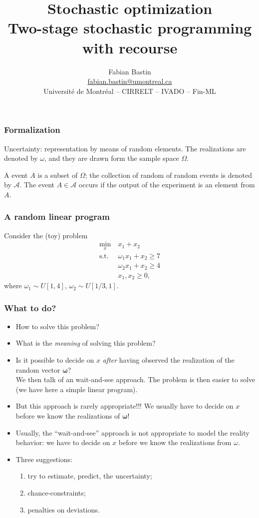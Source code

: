 \documentclass{beamer}
\author[Fabian Bastin]{Fabian Bastin \\ \url{fabian.bastin@umontreal.ca} \\ Université de Montréal -- CIRRELT -- IVADO -- Fin-ML}
\date{}
\title[Two-stage SP]{Stochastic optimization\\Two-stage stochastic programming with recourse}
\def\bomega{\boldsymbol\omega}
\begin{document}
\frame{\titlepage}

\begin{frame}
	\frametitle{Formalization}
	
	Uncertainty: representation by means of {\red random elements}.
	The realizations are denoted by $\omega$, and they are drawn form the sample space $\Omega$.
	
	\mbox{}
	
	A {\red event} $A$ is a subset of $\Omega$; the collection of random of random events is denoted by $\mathcal{A}$.
	The event $A \in \mathcal{A}$ occurs if the output of the experiment is an element from $A$.
	
\end{frame}

\begin{frame}
	\frametitle{A random linear program}
	
	Consider the (toy)	problem
	\begin{align*}
	\min_x\ & x_1+x_2\\
	\mbox{s.t. } & \omega_1x_1 + x_2 \geq 7 \\
	& \omega_2x_1 + x_2 \geq 4 \\
	& x_1, x_2 \geq 0,
	\end{align*}
	where $\omega_1 \sim U[1,4]$, $\omega_2\sim U[1/3,1]$.
\end{frame}

\begin{frame}
	\frametitle{What to do?}
	
	\begin{itemize}
		\item
		How to solve this problem?
		\item
		What is the {\sl meaning} of solving this problem?
		\item
		Is it possible to decide on $x$ {\sl after} having observed the realization of the random vector $\bomega$?\\
		We then talk of an {\red wait-and-see} approach.
		The problem is then easier to solve (we have here a simple linear program).
		\item
		But this approach is rarely appropriate!!! We usually have to decide on $x$ {\red before} we know the realizations of $\bomega$!
		\item
		Usually, the ``wait-and-see'' approach is not appropriate to model the reality behavior: we have to decide on $x$ before we know the realizations from $\omega$.
		\item
		Three suggestions:
		\begin{enumerate}
			\item
			try to estimate, predict, the uncertainty;
			\item
			chance-constraints;
			\item
			penalties on deviations.
		\end{enumerate}
	\end{itemize}
	
\end{frame}
\end{document}
